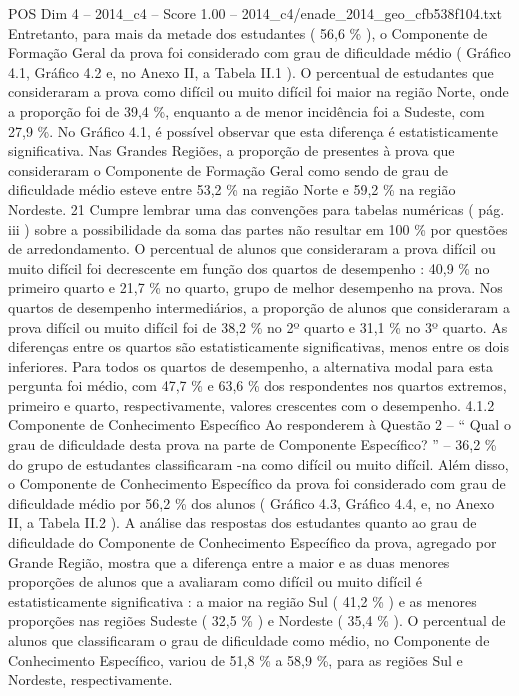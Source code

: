 \begin{textsample}{POS Dim 4 – 2014\_c4 – Score 1.00 – 2014\_c4/enade\_2014\_geo\_cfb538f104.txt}
Entretanto, para mais da metade dos estudantes ( 56,6 \% ), o Componente de Formação Geral da prova foi considerado com grau de dificuldade médio ( Gráfico 4.1, Gráfico 4.2 e, no Anexo II, a Tabela II.1 ).
O percentual de estudantes que consideraram a prova como difícil ou muito difícil foi maior na região Norte, onde a proporção foi de 39,4 \%, enquanto a de menor incidência foi a Sudeste, com 27,9 \%.
No Gráfico 4.1, é possível observar que esta diferença é estatisticamente significativa.
Nas Grandes Regiões, a proporção de presentes à prova que consideraram o Componente de Formação Geral como sendo de grau de dificuldade médio esteve entre 53,2 \% na região Norte e 59,2 \% na região Nordeste. 21 Cumpre lembrar uma das convenções para tabelas numéricas ( pág. iii ) sobre a possibilidade da soma das partes não resultar em 100 \% por questões de arredondamento.
O percentual de alunos que consideraram a prova difícil ou muito difícil foi decrescente em função dos quartos de desempenho : 40,9 \% no primeiro quarto e 21,7 \% no quarto, grupo de melhor desempenho na prova.
Nos quartos de desempenho intermediários, a proporção de alunos que consideraram a prova difícil ou muito difícil foi de 38,2 \% no 2º quarto e 31,1 \% no 3º quarto.
As diferenças entre os quartos são estatisticamente significativas, menos entre os dois inferiores.
Para todos os quartos de desempenho, a alternativa modal para esta pergunta foi médio, com 47,7 \% e 63,6 \% dos respondentes nos quartos extremos, primeiro e quarto, respectivamente, valores crescentes com o desempenho. 4.1.2 Componente de Conhecimento Específico Ao responderem à Questão 2 – “ Qual o grau de dificuldade desta prova na parte de Componente Específico? ” – 36,2 \% do grupo de estudantes classificaram -na como difícil ou muito difícil.
Além disso, o Componente de Conhecimento Específico da prova foi considerado com grau de dificuldade médio por 56,2 \% dos alunos ( Gráfico 4.3, Gráfico 4.4, e, no Anexo II, a Tabela II.2 ).
A análise das respostas dos estudantes quanto ao grau de dificuldade do Componente de Conhecimento Específico da prova, agregado por Grande Região, mostra que a diferença entre a maior e as duas menores proporções de alunos que a avaliaram como difícil ou muito difícil é estatisticamente significativa : a maior na região Sul ( 41,2 \% ) e as menores proporções nas regiões Sudeste ( 32,5 \% ) e Nordeste ( 35,4 \% ).
O percentual de alunos que classificaram o grau de dificuldade como médio, no Componente de Conhecimento Específico, variou de 51,8 \% a 58,9 \%, para as regiões Sul e Nordeste, respectivamente.

\end{textsample}
